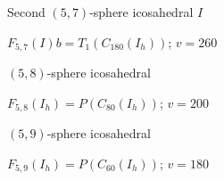 \documentclass[%
pdf,
colorBG,
slideColor,
]{prosper}
\begin{document}
\begin{slide}{Second $(5,7)$-sphere icosahedral $I$}
\begin{center}
\begin{minipage}{5.5cm}
\centering
{}\par
\end{minipage}
\hspace{0.1cm}
\begin{minipage}{5.5cm}
\centering
{}\par
\end{minipage}
\end{center}
\begin{center}
$F_{5,7}(I)b = T_1(C_{180}(I_h))$; $v=260$
\end{center}
\end{slide}




\begin{slide}{$(5,8)$-sphere icosahedral}
\begin{center}
\begin{minipage}{5.5cm}
\centering
{}\par
\end{minipage}
\hspace{0.1cm}
\begin{minipage}{5.5cm}
\centering
{}\par
\end{minipage}
\end{center}
\begin{center}
$F_{5,8}(I_h) = P(C_{80}(I_h))$; $v=200$
\end{center}
\end{slide}



\begin{slide}{$(5,9)$-sphere icosahedral}
\begin{center}
\begin{minipage}{5.5cm}
\centering
{}\par
\end{minipage}
\hspace{0.1cm}
\begin{minipage}{5.5cm}
\centering
{}\par
\end{minipage}
\end{center}
\begin{center}
$F_{5,9}(I_h) = P(C_{60}(I_h))$; $v=180$
\end{center}
\end{slide}
\end{document}
